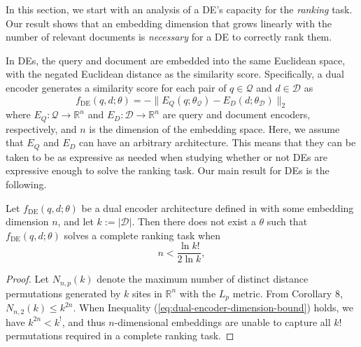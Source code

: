 \documentclass[11pt, a4paper, onecolumn, confidential, copyright, gdm]{google}
\begin{document}
In this section, we start with an analysis of a DE's capacity for the \emph{ranking} task. 
Our result shows that an embedding dimension that grows linearly with the number of relevant documents is \emph{necessary} for a DE to correctly rank them. 

In DEs, the query and document are embedded into the same Euclidean space, with the negated Euclidean distance as the similarity score. 
Specifically, a dual encoder generates a similarity score for each pair of $q \in \mathcal{Q}$ and $d \in \mathcal{D}$ as
\begin{equation}\label{eq:dual-encoder-ranking-architecture}
    f_\text{DE}(q, d; \theta) = -\|E_Q(q; \theta_\mathcal{Q}) - E_D(d; \theta_\mathcal{D})\|_2    
\end{equation}
where $E_Q: \mathcal{Q} \to \mathbb{R}^n$ and $E_D: \mathcal{D} \to \mathbb{R}^n$ are query and document encoders, respectively, and $n$ is the dimension of the embedding space.
Here, we assume that $E_Q$ and $E_D$ can have an arbitrary architecture. This means that they can be taken to be as expressive as needed when studying whether or not DEs are expressive enough to solve the ranking task. Our main result for DEs is the following.

\begin{prop}
Let $f_\text{DE}(q, d; \theta)$ be a dual encoder architecture defined in  with some embedding dimension $n$, and let $k := |\mathcal{D}|$. Then there does not exist a $\theta$ such that $f_\text{DE}(q, d; \theta)$ solves a complete ranking task when
    \begin{equation}\label{eq:dual-encoder-dimension-bound}
        n < \frac{\ln k!}{2 \ln k}, 
    \end{equation}
\end{prop}
\begin{proof}
    Let $N_{n, p}(k)$ denote the maximum number of distinct distance permutations generated by $k$ sites in $\mathbb{R}^n$ with the $L_p$ metric. From \citet{skala2009counting} Corollary 8, $N_{n, 2}(k) \le k^{2n}$. When Inequality (\ref{eq:dual-encoder-dimension-bound}) holds, we have $k^{2n} < k^!$, and thus $n$-dimensional embeddings are unable to capture all $k!$ permutations required in a complete ranking task. 
\end{proof}
\end{document}
